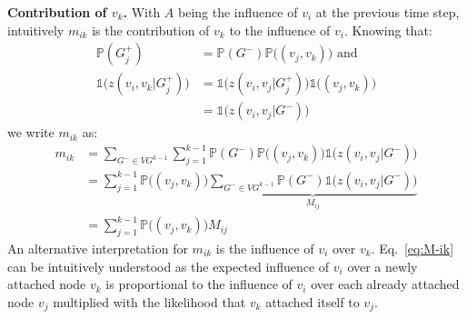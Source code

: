 \textbf{Contribution of $v_k$.}
With $A$ being the influence of $v_i$ at the previous time step, intuitively $m_{ik}$ is the contribution of $v_k$ to the influence of $v_i$.
Knowing that:
\begin{align*}
	\mathds{P}(G_j^+) &= \mathds{P}(G^-)\mathds{P}\big((v_j,v_k)\big) \text{ and } \\
	\mathds{1}\big(z(v_i,v_k|G_j^+)\big) &= \mathds{1}\big(z(v_i,v_j|G^+_j)\big) \mathds{1}\big((v_j,v_k)\big) \\
	 &= \mathds{1}\big(z(v_i,v_j|G^-)\big)
\end{align*}
we write $m_{ik}$ as:
%
\begin{align}
	m_{ik} &= \sum_{G^- \in {VG^{k-1}}} \sum^{k-1}_{j=1} \mathds{P}(G^-)\mathds{P}\big((v_j,v_k)\big) \mathds{1}\big(z(v_i,v_j|G^-)\big) \nonumber \\
           &= \sum^{k-1}_{j=1} \mathds{P}\big((v_j,v_k)\big) \underbrace{ \sum_{G^- \in {VG^{k-1}}} \mathds{P}(G^-) \mathds{1}\big(z(v_i,v_j|G^-)\big)}_{M_{ij}} \nonumber \\  
		   &= \sum^{k-1}_{j=1} \mathds{P}\big((v_j,v_k)\big) M_{ij} \label{eq:M-ik}
\end{align}
An alternative interpretation for $m_{ik}$ is the influence of $v_i$ over $v_k$.
Eq.~\eqref{eq:M-ik} can be intuitively understood as the expected influence of $v_i$ over a newly attached node $v_k$ is proportional to the influence of $v_i$ over each already attached node $v_j$ multiplied with the likelihood that $v_k$ attached itself to $v_j$.
